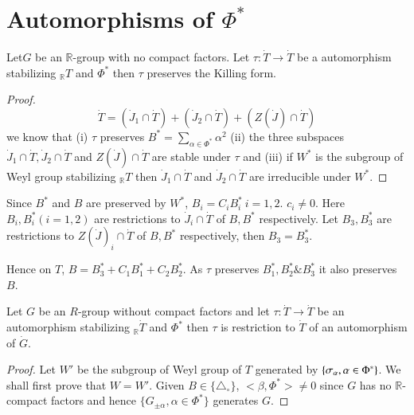 
\chapter{Automorphisms of $\Phi^*$}\label{chap7}

\begin{lemma} \label{chap7:lem7.1}
  Let\pageoriginale $G$ be an $\mathbb{R}$-group with no compact factors. Let
  $\tau:\dot{T} \to \dot{T}$ be a automorphism stabilizing
  ${}_\mathbb{R} T$ and $\Phi^*$ then $\tau$ preserves the Killing form.
\end{lemma}

\begin{proof}
  $$
  \dot{T} = (\dot{J}_1 \cap \dot{T}) + (\dot{J}_2 \cap \dot{T}) +
  (Z(\dot{J}) \cap \dot{T})
  $$
  we know that (i) $\tau$ preserves $B^*= \displaystyle{\sum_{\alpha
      \in \Phi^*}} \alpha^2$  (ii) the three subspaces $\dot{J}_1 \cap
  \dot{T}, \dot{J}_2\cap\dot{T}$ and $Z(\dot{J}) \cap \dot{T}$ are
  stable under $\tau$ and (iii) if $W^*$ is the subgroup of Weyl group
  stabilizing ${}_\mathbb{R} T$ then $\dot{J}_1 \cap \dot{T}$ and
  $\dot{J}_2 \cap \dot{T}$ are irreducible under $W^*$.
\end{proof}

Since $B^*$ and $B$ are preserved by $W^*$, $B_i=C_i B^*_i~ i= 1, 2$. $c_i
\neq 0$. Here $B_i, B_i^*(i=1,2)$ are restrictions to $\dot{J}_i \cap
\dot{T}$ of $B, B^*$ respectively. Let $B_3, B_3^*$ are restrictions
to $Z(\dot{J})_i \cap \dot{T}$ of $B, B^*$ respectively, then $B_3=
B_3^*$. 

Hence on $T$, $B= B^*_3+ C_1 B_1^*+ C_2B_2^*$. As $\tau$ preserves
$B_1^*, B_2^* \& B_3^*$ it also preserves $B$.

\begin{lemma} \label{chap7:lem7.2}
  Let $G$ be an $R$-group without compact factors and let $\tau:
  \dot{T} \to \dot{T}$ be an automorphism stabilizing ${}_{\mathbb{R}}
  \dot{T}$ and $\Phi^*$ then $\tau$ is restriction to $\dot{T}$ of an
  automorphism of $\dot{G}$.
\end{lemma}

\begin{proof}
  Let $W'$ be the subgroup of Weyl group of $T$ generated by $\{
  \sigma_\alpha,\break \alpha \in \Phi^*\}$. We shall first prove that $W=
  W'$. Given $B \in \{ \triangle_\circ \}$, $<\beta, \Phi^*>\neq 0$
  since $G$ has no $\mathbb{R}$-compact factors and hence $\{G_{\pm
    \alpha}, \alpha \in \Phi^*\}$ generates $G$.
\end{proof}

